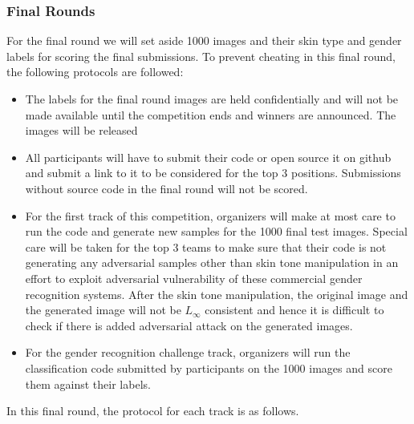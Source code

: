 \documentclass[11pt, oneside]{article}
\begin{document}
\subsubsection{Final Rounds}
For the final round we will set aside 1000 images and their skin type and gender labels for scoring the final submissions. To prevent cheating in this final round, the following protocols are followed:

\begin{itemize}
    \item The labels for the final round images are held confidentially and will not be made available until the competition ends and winners are announced. The images will be released 
    \item All participants will have to submit their code or open source it on github and submit a link to it to be considered for the top 3 positions. Submissions without source code in the final round will not be scored.
    \item For the first track of this competition, organizers will make at most care to run the code and generate new samples for the 1000 final test images. Special care will be taken for the top 3 teams to make sure that their code is not generating any adversarial samples other than skin tone manipulation in an effort to exploit adversarial vulnerability of these commercial gender recognition systems. After the skin tone manipulation, the original image and the generated image will not be $L_{\infty}$ consistent and hence it is difficult to check if there is added adversarial attack on the generated images.
    \item For the gender recognition challenge track, organizers will run the classification code submitted by participants on the 1000 images and score them against their labels. 
\end{itemize}


In this final round, the protocol for each track is as follows. 
\end{document}
